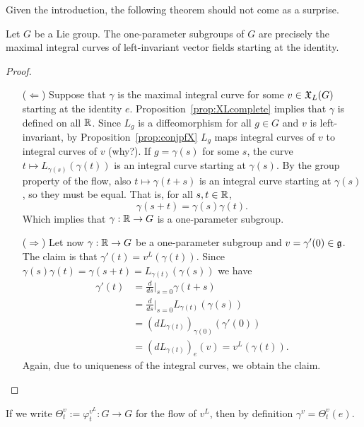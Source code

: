 Given the introduction, the following theorem should not come as a surprise.
\begin{theorem}
	Let $G$ be a Lie group.
	The one-parameter subgroups of $G$ are precisely the maximal integral curves of left-invariant vector fields starting at the identity.
\end{theorem}
\begin{proof}
	\begin{itemize}
		\item[($\Longleftarrow$)]
		      Suppose that $\gamma$ is the maximal integral curve for some $v\in\mathfrak{X}_L(G)$ starting at the identity $e$.
		      Proposition~\ref{prop:XLcomplete} implies that $\gamma$ is defined on all $\mathbb{R}$. Since $L_g$ is a diffeomorphism for all $g\in G$ and $v$ is left-invariant, by Proposition~\ref{prop:conjpfX} $L_g$ maps integral curves of $v$ to integral curves of $v$ (why?).
		      If $g=\gamma(s)$ for some $s$, the curve $t\mapsto L_{\gamma(s)}(\gamma(t))$ is an integral curve starting at $\gamma(s)$.
		      By the group property of the flow, also $t\mapsto \gamma(t+s)$ is an integral curve starting at $\gamma(s)$, so they must be equal.
		      That is, for all $s,t\in \mathbb{R}$,
		      \begin{equation}
			      \gamma(s+t) = \gamma(s)\gamma(t).
		      \end{equation}
		      Which implies that $\gamma:\mathbb{R}\to G$ is a one-parameter subgroup.
		\item[($\Longrightarrow$)] Let now $\gamma:\mathbb{R}\to G$ be a one-parameter subgroup and $v = \gamma'(0)\in \mathfrak{g}$.
		      The claim is that $\gamma'(t) = v^L(\gamma(t))$.
		      Since $\gamma(s)\gamma(t) = \gamma(s+t) = L_{\gamma(t)}(\gamma(s))$ we have
		      \begin{align}
			      \gamma'(t) & = \frac{d}{ds}\Big|_{s=0} \gamma(t+s)              \\
			                 & = \frac{d}{ds}\Big|_{s=0} L_{\gamma(t)}(\gamma(s)) \\
			                 & = (dL_{\gamma(t)})_{\gamma(0)}(\gamma'(0))         \\
			                 & = (dL_{\gamma(t)})_{e}(v)
			      = v^L(\gamma(t)).
		      \end{align}
		      Again, due to uniqueness of the integral curves, we obtain the claim.
	\end{itemize}
\end{proof}

If we write $\Theta_t^v:=\varphi^{v^L}_t:G\to G$ for the flow of $v^L$, then by definition $\gamma^v = \Theta_t^v(e)$.

